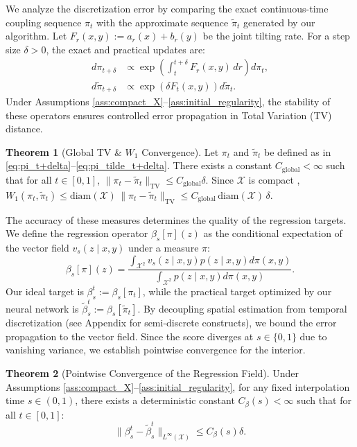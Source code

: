\documentclass[11pt]{article}
\theoremstyle{definition}
\newtheorem{theorem}{Theorem}[section]
\numberwithin{equation}{section}%
\begin{document}
We analyze the discretization error by comparing the exact continuous-time coupling sequence $\pi_t$ with the approximate sequence $\tilde{\pi}_t$ generated by our algorithm. Let $F_r(x,y) := a_r(x) + b_r(y)$ be the joint tilting rate. For a step size $\delta > 0$, the exact and practical updates are:
\begin{align}
    d\pi_{t+\delta} &\propto \exp\textstyle\left( \int_t^{t+\delta} F_r(x,y) \, dr \right) d\pi_t, \label{eq:pi_t+delta} \\
    d\tilde{\pi}_{t+\delta} &\propto \exp\left( \delta F_t(x,y) \right) d\tilde{\pi}_t. \label{eq:pi_tilde_t+delta}
\end{align}
Under Assumptions \ref{ass:compact_X}--\ref{ass:initial_regularity}, the stability of these operators ensures controlled error propagation in Total Variation (TV) distance.

\begin{theorem}[Global TV \& $W_1$ Convergence]
\label{thm:global_tv_convergence}
Let $\pi_t$ and $\tilde{\pi}_t$ be defined as in \eqref{eq:pi_t+delta}--\eqref{eq:pi_tilde_t+delta}. There exists a constant $C_{\mathrm{global}} < \infty$ such that for all $t \in [0,1]$, $\|\pi_t - \tilde{\pi}_t\|_{\mathrm{TV}} \le C_{\mathrm{global}} \delta$.
Since $\mathcal{X}$ is compact , $W_1(\pi_t, \tilde{\pi}_t) \le \mathrm{diam}(\mathcal{X})\,\|\pi_t - \tilde{\pi}_t\|_{\mathrm{TV}} \le C_{\mathrm{global}}\,\mathrm{diam}(\mathcal{X})\,\delta$.
\end{theorem}


The accuracy of these measures determines the quality of the regression targets. We define the regression operator $\beta_s[\pi](z)$ as the conditional expectation of the vector field $v_s(z \mid x,y)$ under a measure $\pi$:
\begin{equation}
\label{eq:beta_functional}
    \beta_s[\pi](z) = \frac{\int_{\mathcal{X}^2} v_s(z \mid x,y) p(z \mid x,y) d\pi(x,y)}{\int_{\mathcal{X}^2} p(z \mid x,y) d\pi(x,y)}.
\end{equation}
Our ideal target is $\beta_s^t := \beta_s[\pi_t]$, while the practical target optimized by our neural network is $\tilde{\beta}_s^t := \beta_s[\tilde{\pi}_t]$. By decoupling spatial estimation from temporal discretization (see Appendix for semi-discrete constructs), we bound the error propagation to the vector field. Since the score diverges at $s \in \{0,1\}$ due to vanishing variance, we establish pointwise convergence for the interior.

\begin{theorem}[Pointwise Convergence of the Regression Field]
\label{thm:main_convergence}
Under Assumptions \ref{ass:compact_X}--\ref{ass:initial_regularity}, for any fixed interpolation time $s \in (0,1)$, there exists a deterministic constant $C_\beta(s) < \infty$ such that for all $t \in [0,1]$:
\begin{equation}
    \|\beta_s^t - \tilde{\beta}_s^t\|_{L^\infty(\mathcal{X})} \le C_\beta(s) \delta.
\end{equation}
\end{theorem}
\end{document}
